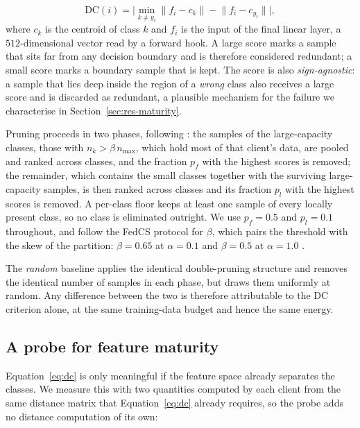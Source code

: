 \documentclass[conference]{IEEEtran}
\begin{document}
\begin{equation}
\mathrm{DC}(i) = \bigl| \min_{k \neq y_i} \lVert f_i - c_k \rVert - \lVert f_i - c_{y_i} \rVert \bigr| ,
\label{eq:dc}
\end{equation}
where $c_k$ is the centroid of class $k$ and $f_i$ is the input of the final linear
layer, a $512$-dimensional vector read by a forward hook. A large score marks a sample
that sits far from any decision boundary and is therefore considered redundant; a
small score marks a boundary sample that is kept. The score is also
\emph{sign-agnostic}: a sample that lies deep inside the region of a \emph{wrong}
class also receives a large score and is discarded as redundant, a plausible
mechanism for the failure we characterise in Section~\ref{sec:res-maturity}.

Pruning proceeds in two phases, following \cite{fedcs}: the samples of the
large-capacity classes, those with $n_k > \beta \, n_{\max}$, which hold most of that
client's data, are pooled and ranked
across classes, and the fraction $p_f$ with the highest scores is removed; the
remainder, which contains the small classes together with the surviving
large-capacity samples, is then ranked across classes and its fraction $p_l$ with the
highest scores is removed. A per-class floor keeps at least one sample of every
locally present class, so no class is eliminated outright. We use $p_f = 0.5$ and
$p_l = 0.1$ throughout, and follow the FedCS protocol for $\beta$, which pairs the
threshold with the skew of the partition: $\beta = 0.65$ at $\alpha = 0.1$ and
$\beta = 0.5$ at $\alpha = 1.0$ \cite{fedcs}.

The \emph{random} baseline applies the identical double-pruning structure and removes the
identical number of samples in each phase, but draws them uniformly at random. Any
difference between the two is therefore attributable to the DC criterion alone, at the
same training-data budget and hence the same energy.

\subsection{A probe for feature maturity}\label{sec:signal}
Equation~\eqref{eq:dc} is only meaningful if the feature space already separates the
classes. We measure this with two quantities computed by each client from the same
distance matrix that Equation~\eqref{eq:dc} already requires, so the probe adds no
distance computation of its own:
\end{document}
